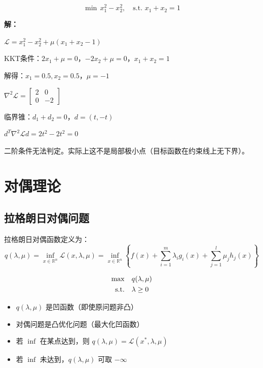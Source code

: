 \begin{example}[二阶条件判定鞍点]
\[
\min \, x_1^2 - x_2^2, \quad \text{s.t. } x_1 + x_2 = 1
\]

\textbf{解：}

$\mathcal{L} = x_1^2 - x_2^2 + \mu(x_1 + x_2 - 1)$

KKT条件：$2x_1 + \mu = 0$，$-2x_2 + \mu = 0$，$x_1 + x_2 = 1$

解得：$x_1 = 0.5, x_2 = 0.5$，$\mu = -1$

$\nabla^2 \mathcal{L} = \begin{bmatrix} 2 & 0 \\ 0 & -2 \end{bmatrix}$

临界锥：$d_1 + d_2 = 0$，$d = (t, -t)$

$d^T \nabla^2 \mathcal{L} d = 2t^2 - 2t^2 = 0$

二阶条件无法判定。实际上这不是局部极小点（目标函数在约束线上无下界）。
\end{example}

\section{对偶理论}\label{sec:duality}

\subsection{拉格朗日对偶问题}

\begin{definition}[对偶函数]
拉格朗日对偶函数定义为：
\[
q(\lambda, \mu) = \inf_{x \in \mathbb{R}^n} \mathcal{L}(x, \lambda, \mu) = \inf_{x \in \mathbb{R}^n} \left\{f(x) + \sum_{i=1}^m \lambda_i g_i(x) + \sum_{j=1}^l \mu_j h_j(x)\right\}
\]
\end{definition}

\begin{definition}[拉格朗日对偶问题]
\begin{align}
\max \quad & q(\lambda, \mu) \label{eq:dual} \\
\text{s.t.} \quad & \lambda \geq 0 \notag
\end{align}
\end{definition}

\begin{notebox}[对偶函数的性质]
\begin{itemize}
    \item $q(\lambda, \mu)$ 是凹函数（即使原问题非凸）
    \item 对偶问题是凸优化问题（最大化凹函数）
    \item 若 $\inf$ 在某点达到，则 $q(\lambda, \mu) = \mathcal{L}(x^*, \lambda, \mu)$
    \item 若 $\inf$ 未达到，$q(\lambda, \mu)$ 可取 $-\infty$
\end{itemize}
\end{notebox}

